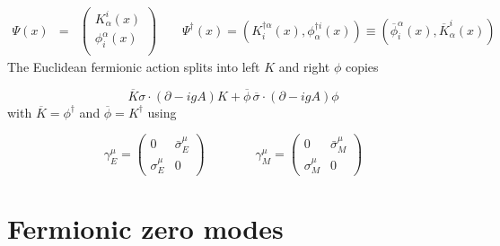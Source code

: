 \documentclass[11pt,aps,amsmath,amssymb,nofootinbib,notitlepage,longbibliography]{revtex4-1}
\newcommand{\be}{\begin{equation}}
\newcommand{\ee}{\end{equation}}
\begin{document}
\begin{eqnarray}
\label{NOTE1}
\Psi(x)&=&
\begin{pmatrix}
K^i_\alpha(x)\\
\phi^\alpha_i(x) \\
\end{pmatrix}
\qquad
\Psi^\dagger(x)=({K}_i^{\dagger\alpha}(x),\phi_\alpha^{\dagger i}(x))\equiv   (\overline{\phi}^\alpha_i(x), \overline{K}^i_\alpha(x))
\end{eqnarray}
The Euclidean fermionic action splits into left $K$ and right $\phi$ copies

\be
\overline K\sigma\cdot (\partial-igA)K+\overline \phi\,\overline\sigma\cdot(\partial -igA)\phi
\ee
with  $\overline K=\phi^\dagger$ and  $\overline\phi=K^\dagger$ using

\be
\gamma_E^\mu=
\begin{pmatrix}
0& \bar\sigma_E^\mu\\
\sigma_E^\mu &0
\end{pmatrix}\qquad\qquad
\gamma_M^\mu=
\begin{pmatrix}
0& \bar\sigma_M^\mu\\
\sigma_M^\mu &0
\end{pmatrix}
\ee



\section{Fermionic zero modes }\label{app_zero}
\end{document}
